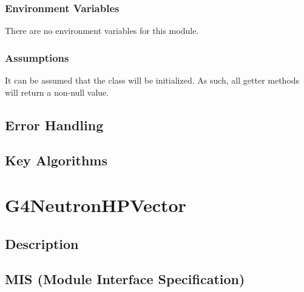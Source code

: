 \documentclass[12pt]{article}
\begin{document}
\subsubsection{Environment Variables}%
There are no environment variables for this module.

\subsubsection{Assumptions}%
It can be assumed that the class will be initialized. As such, all getter methods will return a non-null value.

\subsection{Error Handling}

\subsection{Key Algorithms}


\section{G4NeutronHPVector}

\subsection{Description}

\subsection{MIS (Module Interface Specification)}
\end{document}
